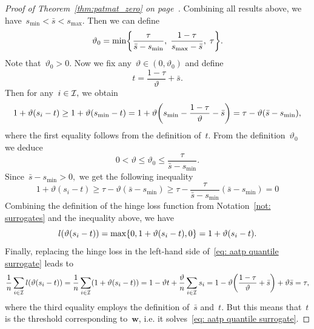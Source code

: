 \begin{proof}[Proof of Theorem~\ref{thm:patmat_zero} on page~\pageref{thm:patmat_zero}]
  Combining all results above, we have~$s_{\min} < \bar{s} < s_{\max}$. Then we can define
  \begin{equation*}
    \vartheta_0 = \min\Brac[c]{\frac{\tau}{\bar{s} - s_{\min}}, \; \frac{1-\tau}{s_{\max}-\bar{s}}, \; \tau}.
  \end{equation*}
  Note that~$\vartheta_0 > 0.$ Now we fix any~$\vartheta \in (0, \vartheta_0)$ and define
  \begin{equation*}
    t = \frac{1 - \tau}{\vartheta} + \bar{s}.
  \end{equation*}
  Then for any~$i \in \mathcal{I},$ we obtain 
  \begin{equation*}
    1 + \vartheta(s_i - t)
      \geq 1 + \vartheta(s_{\min} - t)
      = 1 + \vartheta \Brac{s_{\min} - \frac{1 - \tau}{\vartheta} - \bar{s}}
      = \tau - \vartheta (\bar{s} - s_{\min}),
  \end{equation*}
  where the first equality follows from the definition of~$t.$ From the definition~$\vartheta_0$ we deduce
  \begin{equation*}
    0 < \vartheta \leq \vartheta_0 \leq \frac{\tau}{\bar{s} - s_{\min}}.
  \end{equation*}
  Since~$\bar{s} - s_{\min} > 0,$ we get the following inequality
  \begin{equation}\label{eq:patmat_zero_aux1}
    1 + \vartheta(s_i - t)
      \geq \tau - \vartheta (\bar{s} - s_{\min})
      \geq \tau - \frac{\tau}{\bar{s} - s_{\min}} (\bar{s} - s_{\min})
      = 0
  \end{equation}
  Combining the definition of the hinge loss function from Notation~\ref{not: surrogates} and the inequality above, we have
  \begin{equation*}
    l\Brac{\vartheta (s_i - t)}
      = \max\{0, 1 + \vartheta (s_i - t), 0\}
      = 1 + \vartheta(s_i - t).
  \end{equation*}
  Finally, replacing the hinge loss in the left-hand side of~\eqref{eq: aatp quantile surrogate} leads to
  \begin{equation*}
    \frac{1}{\nall} \sum_{i \in \I} l\Brac{\vartheta (s_i - t)}
      = \frac{1}{\nall}\sum_{i \in \I}\Brac{1 + \vartheta(s_i - t)}
      = 1 - \vartheta t + \frac{\vartheta}{n} \sum_{i \in \I} s_i
      = 1 - \vartheta \Brac{\frac{1 - \tau}{\vartheta} + \bar{s}} + \vartheta \bar{s}
      = \tau,
  \end{equation*}
  where the third equality employs the definition of~$\bar{s}$ and~$t$. But this means that~$t$ is the threshold corresponding to~$\bm{w}$, i.e. it solves~\eqref{eq: aatp quantile surrogate}.
  

\end{proof}
